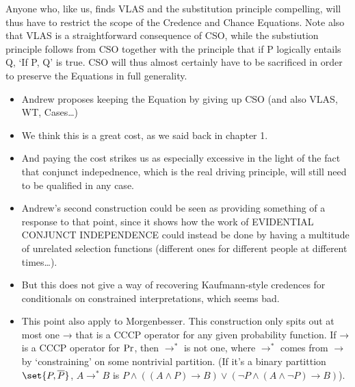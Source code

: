 \documentclass[If.tex]{subfiles}
\begin{document}
Anyone who, like us, finds VLAS and the substitution principle compelling, will thus have to restrict the scope of the Credence and Chance Equations. Note also that VLAS is a straightforward consequence of CSO, while the substiution principle follows from CSO together with the principle that if P logically entails Q, ‘If P, Q’ is true. CSO will thus almost certainly have to be sacrificed in order to preserve the Equations in full generality.

\begin{itemize}
	\item
	Andrew proposes keeping the Equation by giving up CSO (and also VLAS, WT, Cases…)
	\item
	We think this is a great cost, as we said back in chapter 1.  
	\item
	And paying the cost strikes us as especially excessive in the light of the fact that conjunct indepednence, which is the real driving principle, will still need to be qualified in any case.  
	\item
	Andrew's second construction could be seen as providing something of a response to that point, since it shows how the work of EVIDENTIAL CONJUNCT INDEPENDENCE could instead be done by having a multitude of unrelated selection functions (different ones for different people at different times…).  
	\item
	But this does not give a way of recovering Kaufmann-style credences for conditionals on constrained interpretations, which seems bad.  
	\item
	This point also apply to Morgenbesser.  This construction only spits out at most one → that is a CCCP operator for any given probability function.  If → is a CCCP operator for $\operatorname{Pr}$, then $→^*$ is not one, where $→^*$ comes from $→$ by ‘constraining’ on some nontrivial partition.  (If it's a binary partittion $\set{P,\negate{P}}$, $A→^*B$ is $P ∧ ((A∧P)→B) ∨ (¬P ∧ (A∧¬P)→B)$). 
\end{itemize}
\end{document}
